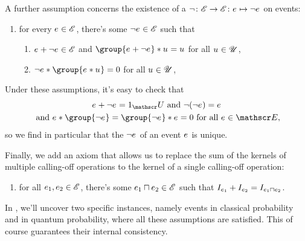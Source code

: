 \documentclass[preprint]{isipta2025}
\begin{document}
A further assumption concerns the existence of a  \(\neg\colon\eventopts\to\eventopts\colon\eventopt\mapsto\neg\eventopt\) on events:
\begin{enumerate}[resume*=events,widest=8]
\item\label{axiom:event:complement} for every \(\eventopt\in\eventopts\), there's some \(\neg\eventopt\in\eventopts\) such that
\begin{enumerate}[label={\upshape\alph*.},ref={\upshape\alph*},leftmargin=*,itemsep=0pt,widest=b]
\item\label{it:event:complement:sum} \(\eventopt+\neg\eventopt\in\eventopts\) and \(\group{\eventopt+\neg\eventopt}\ast\opt=\opt\) for all \(\opt\in\opts\),
\item\label{it:event:complement:nullify} \(\neg\eventopt\ast\group{\eventopt\ast\opt}=0\) for all \(\opt\in\opts\),
\end{enumerate}
\end{enumerate}
Under these assumptions, it's easy to check that
\begin{multline}\label{eq:event:complement:properties}
\eventopt+\neg\eventopt=\uniteventopt
\text{ and }
\neg(\neg\eventopt)=\eventopt\\
\text{ and }
\eventopt\ast\group{\neg\eventopt}
=\group{\neg\eventopt}\ast\eventopt
=0
\text{ for all \(\eventopt\in\eventopts\)},
\end{multline}
so we find in particular that the  \(\neg\eventopt\) of an event \(\eventopt\) is unique.

Finally, we add an axiom that allows us to replace the sum of the kernels of multiple calling-off operations to the kernel of a single calling-off operation:
\begin{enumerate}[resume*=events,widest=9]
\item\label{axiom:event:kernel:sum} for all \(\eventopt[1],\eventopt[2]\in\eventopts\), there's some \(\eventopt[1]\sqcap\eventopt[2]\in\eventopts\) such that \(\eventindifset[1]+\eventindifset[2]=\indifset[{\eventopt[1]\sqcap\eventopt[2]}]\).
\end{enumerate}

In , we'll uncover two specific instances, namely events in classical probability and in quantum probability, where all these assumptions are satisfied.
This of course guarantees their internal consistency.
\end{document}

